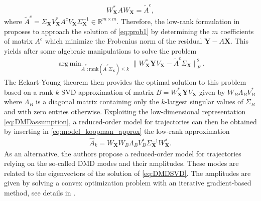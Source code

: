 \documentclass{article}
\newcommand{\Rr}{\mathds{R}}
\newcommand{\AAA}{\mathbf{X}}
\newcommand{\BBB}{\mathbf{Y}}
\newcommand{\ie}{\textit{i.e.}, }
\DeclareMathOperator*{\argmin}{arg\,min}
\def\remCH#1{{\noindent\color{red}{{\footnotesize [CH: #1]}}}}
\begin{document}
\begin{align}\label{eq:DMDassumption}
 W_\AAA^*AW_\AAA=\tilde A^c,
\end{align}
where $ \tilde A^c=\Sigma_\AAA V_\AAA^*A^cV_\AAA\Sigma_\AAA^{-1}\in \Rr^{ m \times  m}.$ %
Therefore, the low-rank  formulation in \cite{Jovanovic12} proposes to approach the solution of \eqref{eq:prob1} by determining the $m$ coefficients of matrix $A^c$ which minimize  the Frobenius norm of   the residual $ \BBB -A \AAA $. %
This yields after some algebraic manipulations to solve the problem %
\begin{align}\label{eq:DMDSVD}
\argmin_{ \tilde A^c: \textrm{rank}(\tilde A^c\Sigma_\AAA)\le k} \|W_\AAA^*\BBB V_\AAA - \tilde A^c \Sigma_\AAA\|^2_F.
\end{align}
 The Eckart-Young theorem \cite{eckart1936approximation} then provides the optimal  solution  to this problem based  on a  rank-$k$  SVD approximation of matrix $B=W_\AAA^*\BBB V_\AAA$ given by  $W_B\Lambda_BV_B^*$ where $\Lambda_B$ is a diagonal matrix containing only the $k$-largest singular values of $\Sigma_B$ and with zero entries {otherwise}. %
  Exploiting the  low-dimensional representation \eqref{eq:DMDassumption}, a reduced-order model for trajectories can then be obtained  by inserting in \eqref{eq:model_koopman_approx} the low-rank approximation  %
 \begin{align}\label{eq:projDMD}
 \hat A_k=W_\AAA W_B\Lambda_BV_B^*\Sigma_\AAA^{-1}W_\AAA^*.
 \end{align}
   As an alternative, the authors propose a reduced-order model for trajectories relying on the so-called DMD modes and their amplitudes. These modes are related to the eigenvectors of the solution of \eqref{eq:DMDSVD}.  The amplitudes are  given by solving a convex optimization problem with an iterative gradient-based method, see details in \cite{Jovanovic12}.  
 
\end{document}
